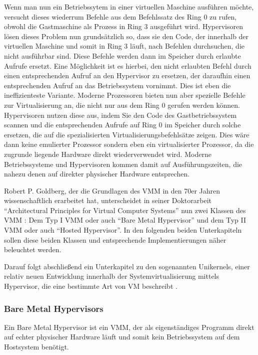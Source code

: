 Wenn man nun ein Betriebssytem in einer virtuellen Maschine ausführen möchte, versucht dieses wiederrum Befehle aus dem Befehlssatz des Ring 0 zu rufen, obwohl die Gastmaschine als Prozess in Ring 3 ausgeführt wird. Hypervisoren lösen dieses Problem nun grundsätzlich so, dass sie den Code, der innerhalb der virtuellen Maschine und somit in Ring 3 läuft, nach Befehlen durchsuchen, die nicht ausführbar sind. Diese Befehle werden dann im Speicher durch erlaubte Aufrufe ersetzt. Eine Möglichkeit ist es hierbei, den nicht erlaubten Befehl durch einen entsprechenden Aufruf an den Hypervisor zu ersetzen, der daraufhin einen entsprechenden Aufruf an das Betriebssystem vornimmt. Dies ist eben die ineffizienteste Variante. Moderne Prozessoren bieten nun aber spezielle Befehle zur Virtualisierung an, die nicht nur aus dem Ring 0 gerufen werden können. Hypervisoren nutzen diese aus, indem Sie den Code des Gastbetriebssystem scannen und die entsprechenden Aufrufe auf Ring 0 im Speicher durch solche ersetzen, die auf die spezialisierten Virtualisierungsbefehlsätze zeigen. Dies wäre dann keine emulierter Prozessor sondern eben ein virtualisierter Prozessor, da die zugrunde liegende Hardware direkt wiederverwendet wird. Moderne Betriebssysteme und Hypervisoren kommen damit auf Ausführungszeiten, die nahezu denen auf direkter physischer Hardware entsprechen.

Robert P. Goldberg, der die Grundlagen des \ac{VMM} in den 70er Jahren wissenschaftlich erarbeitet hat, unterscheidet in seiner Doktorarbeit "`Architectural Principles for Virtual Computer Systems"' nun zwei Klassen des \ac{VMM} \citep[vgl.][S. 22 ff.]{Goldberg73}: Dem Typ I \ac{VMM} oder auch "`Bare Metal Hypervisor"' und dem Typ II \ac{VMM} oder auch "`Hosted Hypervisor"'. In den folgenden beiden Unterkapiteln sollen diese beiden Klassen und entsprechende Implementierungen näher beleuchtet werden.

Darauf folgt abschließend ein Unterkapitel zu den sogenannten Unikernels, einer relativ neuen Entwicklung innerhalb der Systemvirtualisierung mittels Hypervisor, die eine bestimmte Art von \ac{VM} beschreibt \citep[siehe Abstract]{MadMorAnd13}.

\subsubsection{Bare Metal Hypervisors}

Ein Bare Metal Hypervisor ist ein \ac{VMM}, der als eigenständiges Programm direkt auf echter physischer Hardware läuft und somit kein Betriebssystem auf dem Hostsystem benötigt.

